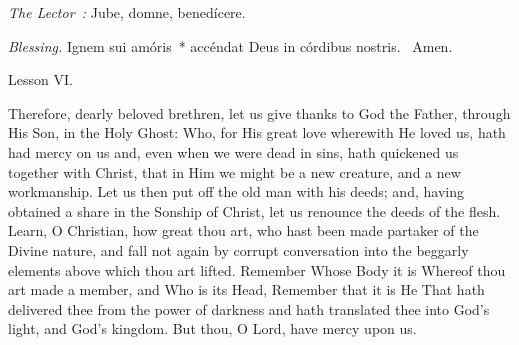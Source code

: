 {{    \emph{The Lector~:} Jube, domne, benedícere.

    \emph{Blessing.} Ignem sui amóris~* accéndat Deus in córdibus nostris. \Rbar{}~Amen.
  }

  \bigskip{}
  {
    \hfil{Lesson VI.}\hfil

    \begin{parcolumns}[rulebetween,colwidths={1=.43\linewidth}]{2}
    {Therefore, dearly beloved brethren, let us give thanks to God the Father, through His Son, in the Holy Ghost: Who, for His great love wherewith He loved us, hath had mercy on us and, even when we were dead in sins, hath quickened us together with Christ, that in Him we might be a new creature, and a new workmanship. Let us then put off the old man with his deeds; and, having obtained a share in the Sonship of Christ, let us renounce the deeds of the flesh. Learn, O Christian, how great thou art, who hast been made partaker of the Divine nature, and fall not again by corrupt conversation into the beggarly elements above which thou art lifted. Remember Whose Body it is Whereof thou art made a member, and Who is its Head, Remember that it is He That hath delivered thee from the power of darkness and hath translated thee into God's light, and God's kingdom.
      But thou, O Lord, have mercy upon us.}
    \end{parcolumns}

  }

  {
    \bigskip
    \medskip
  }
}